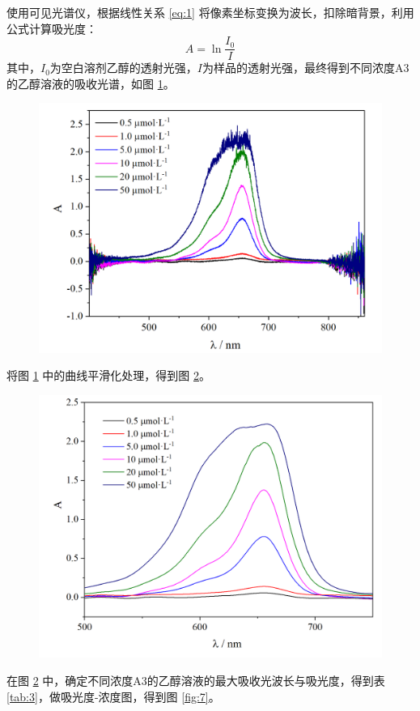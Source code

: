 使用可见光谱仪，根据线性关系 \eqref{eq:1} 将像素坐标变换为波长，扣除暗背景，利用公式计算吸光度：
\begin{equation*}
    A = \ln{\frac{I_0}{I}}
\end{equation*}
其中，$I_0$为空白溶剂乙醇的透射光强，$I$为样品的透射光强，最终得到不同浓度A3的乙醇溶液的吸收光谱，如图 \ref{fig:5}。

\begin{figure}[H]
    \centering
    \includegraphics[width=.6\textwidth]{figures2/2-1.png}
    \label{fig:5}
\end{figure}

将图 \ref{fig:5} 中的曲线平滑化处理，得到图 \ref{fig:6}。

\begin{figure}[H]
    \centering
    \includegraphics[width=.6\textwidth]{figures2/2-4.png}
    \label{fig:6}
\end{figure}

在图 \ref{fig:6} 中，确定不同浓度A3的乙醇溶液的最大吸收光波长与吸光度，得到表 \eqref{tab:3}，做吸光度-浓度图，得到图 \ref{fig:7}。

